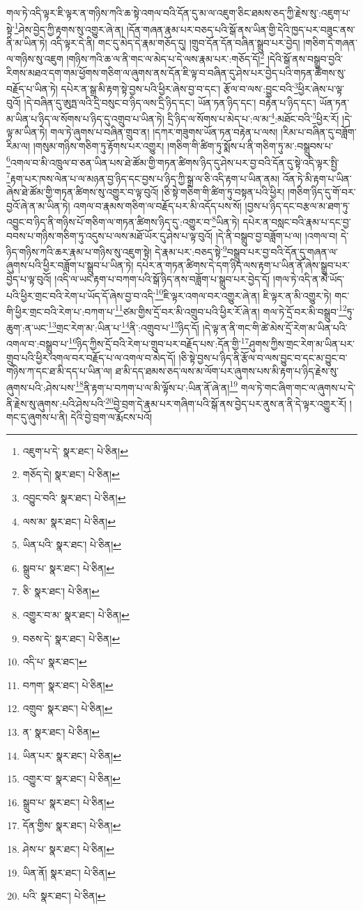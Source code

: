 གལ་ཏེ་འདི་ལྟར་ཇི་ལྟར་ན་གཉིས་ཀའི་ཆ་སྟེ་འགལ་བའི་དོན་དུ་མ་ལ་འཇུག་ཅིང་ཐམས་ཅད་ཀྱི་རྗེས་སུ་:འཇུག་པ་སྟེ་\footnote{འཇུག་པ་དེ་  སྣར་ཐང་།  པེ་ཅིན། }ཤེས་བྱེད་ཀྱི་རྟགས་སུ་འགྱུར་ཞེ་ན། །དོན་གཞན་རྣམ་པར་བཅད་པའི་སྒོ་ནས་ཡིན་གྱི་དེའི་ཁྱད་པར་བཟུང་ནས་ནི་མ་ཡིན་ཏེ། འདི་ལྟར་དེ་ནི། གང་དུ་མེད་དེ་རྣམ་གཅོད་དུ། །གྲུབ་དོན་དོན་བཞིན་སྒྲུབ་པར་བྱེད། །གཅིག་དེ་གཞན་ལ་གཉིས་སུ་འཇུག །གཉིས་ཀའི་ཆ་ལ་ནི་གང་ལ་མེད་པ་དེ་ལས་རྣམ་པར་:གཅོད་དོ།\footnote{གཅོད་དེ།  སྣར་ཐང་།  པེ་ཅིན། } །དེའི་སྒོ་ནས་བསྒྲུབ་བྱའི་རིགས་མཐའ་དག་གམ་ཕྱོགས་གཅིག་ལ་ཞུགས་ནས་དོན་ཇི་ལྟ་བ་བཞིན་དུ་ཤེས་པར་བྱེད་པའི་གཏན་ཚིགས་སུ་བརྗོད་པ་ཡིན་ཏེ། དཔེར་ན་སྒྲ་མི་རྟག་སྟེ་བྱས་པའི་ཕྱིར་ཞེས་བྱ་བ་དང་། རྩོལ་བ་ལས་:བྱུང་བའི་\footnote{འབྱུང་བའི་  སྣར་ཐང་།  པེ་ཅིན། }ཕྱིར་ཞེས་པ་ལྟ་བུའོ། །དེ་བཞིན་དུ་ཨུཏྤ་ལའི་དྲི་བསུང་བ་ཉིད་ལས་དྲི་ཉིད་དང་། ཡོན་ཏན་ཉིད་དང་། བརྟེན་པ་ཉིད་དང་། ཡོན་ཏན་མ་ཡིན་པ་ཉིད་ལ་སོགས་པ་ཉིད་དུ་འགྲུབ་པ་ཡིན་ཏེ། དྲི་ཉིད་ལ་སོགས་པ་མེད་པ་:ལ་མ་\footnote{ལས་མ་  སྣར་ཐང་།  པེ་ཅིན། }:མཐོང་བའི་\footnote{ཡིན་པའི་  སྣར་ཐང་།  པེ་ཅིན། }ཕྱིར་རོ། །དེ་ལྟ་མ་ཡིན་ཏེ། གལ་ཏེ་ཞུགས་པ་བཞིན་གྲུབ་ན། །དཀར་གཟུགས་ཡོན་ཏན་བརྟེན་པ་ལས། །རིམ་པ་བཞིན་དུ་བཟློག་རིམ་ལ། །གསུམ་གཉིས་གཅིག་ཏུ་རྟོགས་པར་འགྱུར། །གཅིག་གི་ཚིག་ཏུ་སྨོས་པ་ནི་གཅིག་ཏུ་མ་:བསྒྲུབས་པ་\footnote{སྒྲུབ་པ་  སྣར་ཐང་།  པེ་ཅིན། }འགལ་བ་མི་འཁྲུལ་བ་ཅན་ཡིན་པས་ཐེ་ཚོམ་གྱི་གཏན་ཚིགས་ཉིད་དུ་ཤེས་པར་བྱ་བའི་དོན་དུ་སྟེ་འདི་ལྟར་སྤྱི་\footnote{ཅི་  སྣར་ཐང་།  པེ་ཅིན། }རྟག་པར་ཁས་ལེན་པ་ལ་མཉན་བྱ་ཉིད་དང་བྱས་པ་ཉིད་ཀྱི་སྒྲ་ལ་ཅི་འདི་རྟག་པ་ཡིན་ནམ། འོན་ཏེ་མི་རྟག་པ་ཡིན་ཞེས་ཐེ་ཚོམ་གྱི་གཏན་ཚིགས་སུ་འགྱུར་བ་ལྟ་བུའོ། །ཅི་སྟེ་གཅིག་གི་ཚིག་ཏུ་བསྟན་པའི་ཕྱིར། །གཅིག་ཉིད་དུ་གོ་བར་བྱའོ་ཞེ་ན་མ་ཡིན་ཏེ། འགལ་བ་རྣམས་གཅིག་ལ་བརྗོད་པར་མི་འདོད་པས་སོ། །བྱས་པ་ཉིད་དང་བརྩལ་མ་ཐག་ཏུ་འབྱུང་བ་ཉིད་ནི་གཉིས་པོ་གཅིག་ལ་གཏན་ཚིགས་ཉིད་དུ་:འགྱུར་བ་\footnote{འགྱུར་བ་མ་  སྣར་ཐང་།  པེ་ཅིན། }ཡིན་ཏེ། དཔེར་ན་བསླང་བའི་རྣམ་པ་དང་བྱ་བབས་པ་གཉིས་གཅིག་ཏུ་འདུས་པ་ལས་མཐོ་ཡོར་དུ་ཤེས་པ་ལྟ་བུའོ། །དེ་ནི་བསྒྲུབ་བྱ་བཟློག་པ་ལ། །འགལ་བ། དེ་ཉིད་གཉིས་ཀའི་ཆར་རྣམ་པ་གཉིས་སུ་འཇུག་སྟེ། དེ་རྣམ་པར་:བཅད་སྟེ་\footnote{བཅས་དེ་  སྣར་ཐང་།  པེ་ཅིན། }བསྒྲུབ་པར་བྱ་བའི་དོན་དུ་གཞན་ལ་ཞུགས་པའི་ཕྱིར་བཟློག་པ་སྒྲུབ་པ་ཡིན་ཏེ། དཔེར་ན་གཏན་ཚིགས་དེ་དག་ཉིད་ལས་རྟག་པ་ཡིན་ནོ་ཞེས་སྒྲུབ་པར་བྱེད་པ་ལྟ་བུའོ། །འདི་ལ་ཡང་རྟག་པ་བཀག་པའི་སྒོ་ཉིད་ནས་བཟློག་པ་སྒྲུབ་པར་བྱེད་དོ། །གལ་ཏེ་འདི་ན་མེ་ཡོད་པའི་ཕྱིར་གྲང་བའི་རེག་པ་ཡོད་དོ་ཞེས་བྱ་བ་འདི་\footnote{འདི་པ་  སྣར་ཐང་། }ཇི་ལྟར་འགལ་བར་འགྱུར་ཞེ་ན། ཇི་ལྟར་ན་མི་འགྱུར་ཏེ། གང་གི་ཕྱིར་གྲང་བའི་རེག་པ་:བཀག་པ་\footnote{བཀག་  སྣར་ཐང་།  པེ་ཅིན། }ཙམ་གྱིས་དྲོ་བར་མི་འགྲུབ་པའི་ཕྱིར་རོ་ཞེ་ན། གལ་ཏེ་དྲོ་བར་མི་བསྒྲུབ་\footnote{འགྲུབ་  སྣར་ཐང་།  པེ་ཅིན། }ཏུ་ཆུག་:ན་ཡང་\footnote{ན་  སྣར་ཐང་།  པེ་ཅིན། }གྲང་རེག་མ་:ཡིན་པ་\footnote{ཡིན་པར་  སྣར་ཐང་།  པེ་ཅིན། }ནི་:འགྲུབ་པ་\footnote{འགྱུར་བ་  སྣར་ཐང་།  པེ་ཅིན། }ཉིད་དོ། །དེ་ལྟ་ན་ནི་གང་གི་ཚེ་མེས་དྲོ་རེག་མ་ཡིན་པའི་འགལ་བ་:བསྒྲུབ་པ་\footnote{སྒྲུབ་པ་  སྣར་ཐང་།  པེ་ཅིན། }ཉིད་ཀྱིས་དྲོ་བའི་རེག་པ་གྲུབ་པར་བརྗོད་པས་:དོན་གྱི་\footnote{དོན་གྱིས་  སྣར་ཐང་།  པེ་ཅིན། }ཤུགས་ཀྱིས་གྲང་རེག་མ་ཡིན་པར་གྲུབ་པའི་ཕྱིར་འགལ་བར་བརྗོད་པ་ལ་འགལ་བ་མེད་དོ། །ཅི་སྟེ་བྱས་པ་ཉིད་ནི་རྩོལ་བ་ལས་བྱུང་བ་དང་མ་བྱུང་བ་གཉིས་ཀ་དང་ཐ་མི་དད་པ་ཡིན་ལ། ཐ་མི་དད་ཐམས་ཅད་ལས་མ་ལོག་པར་ཞུགས་པས་མི་རྟག་པ་ཉིད་རྗེས་སུ་ཞུགས་པའི་:ཤེས་པས་\footnote{ཤེས་པ་  སྣར་ཐང་།  པེ་ཅིན། }ནི་རྟག་པ་བཀག་པ་ལ་མི་ལྟོས་པ་:ཡིན་ནོ་ཞེ་ན།\footnote{ཡིན་ནོ།  སྣར་ཐང་།  པེ་ཅིན། } གལ་ཏེ་གང་ཞིག་གང་ལ་ཞུགས་པ་དེ་ནི་རྗེས་སུ་ཞུགས་:པའི་ཤེས་པའི་\footnote{པའི་  སྣར་ཐང་།  པེ་ཅིན། }བྱེ་བྲག་དེ་རྣམ་པར་གཞིག་པའི་སྒོ་ནས་བྱེད་པར་ནུས་ན་ནི་དེ་ལྟར་འགྱུར་རོ། །གང་དུ་ཞུགས་པ་ནི། དེའི་བྱེ་བྲག་ལ་རྨོངས་པའོ། 